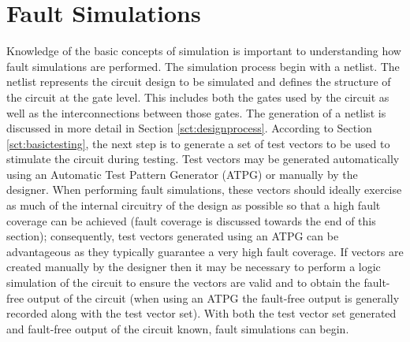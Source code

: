 \documentclass[12pt]{report}
\begin{document}
\section{Fault Simulations}
\label{sct:faultsim}
Knowledge of the basic concepts of simulation is important to understanding how fault simulations are performed.  The simulation process begin with a netlist.  The netlist represents the circuit design to be simulated and defines the structure of the circuit at the gate level.  This includes both the gates used by the circuit as well as the interconnections between those gates\cite{advancedverilog}.  The generation of a netlist is discussed in more detail in Section \ref{sct:designprocess}.  According to Section \ref{sct:basictesting}, the next step is to generate a set of test vectors to be used to stimulate the circuit during testing.  Test vectors may be generated automatically using an Automatic Test Pattern Generator (ATPG)\cite{advancedverilog} or manually by the designer.  When performing fault simulations, these vectors should ideally exercise as much of the internal circuitry of the design as possible so that a high fault coverage can be achieved (fault coverage is discussed towards the end of this section); consequently, test vectors generated using an ATPG can be advantageous as they typically guarantee a very high fault coverage\cite{advancedverilog}.  If vectors are created manually by the designer then it may be necessary to perform a logic simulation of the circuit to ensure the vectors are valid and to obtain the fault-free output of the circuit (when using an ATPG the fault-free output is generally recorded along with the test vector set).  With both the test vector set generated and fault-free output of the circuit known, fault simulations can begin.  
\end{document}
